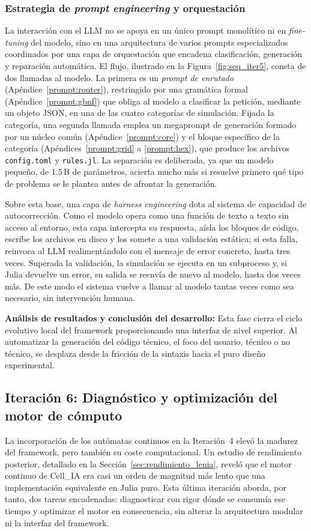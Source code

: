 \documentclass[runningheads]{llncs}
\begin{document}
\subsubsection{Estrategia de \textit{prompt engineering} y orquestación}
\label{sec:prompt_eng}
La interacción con el LLM no se apoya en un único prompt monolítico ni en \textit{fine-tuning} del modelo, sino en una arquitectura de varios prompts especializados coordinados por una capa de orquestación que encadena clasificación, generación y reparación automática. El flujo, ilustrado en la Figura~\ref{fig:seq_iter5}, consta de dos llamadas al modelo. La primera es un \emph{prompt de enrutado} (Apéndice~\ref{prompt:router}), restringido por una gramática formal (Apéndice~\ref{prompt:gbnf}) que obliga al modelo a clasificar la petición, mediante un objeto JSON, en una de las cuatro categorías de simulación. Fijada la categoría, una segunda llamada emplea un megaprompt de generación formado por un núcleo común (Apéndice~\ref{prompt:core}) y el bloque específico de la categoría (Apéndices~\ref{prompt:grid} a \ref{prompt:hex}), que produce los archivos \texttt{config.toml} y \texttt{rules.jl}. La separación es deliberada, ya que un modelo pequeño, de 1.5\,B de parámetros, acierta mucho más si resuelve primero qué tipo de problema se le plantea antes de afrontar la generación.

Sobre esta base, una capa de \textit{harness engineering} dota al sistema de capacidad de autocorrección. Como el modelo opera como una función de texto a texto sin acceso al entorno, esta capa intercepta su respuesta, aísla los bloques de código, escribe los archivos en disco y los somete a una validación estática; si esta falla, reinvoca al LLM realimentándolo con el mensaje de error concreto, hasta tres veces. Superada la validación, la simulación se ejecuta en un subproceso y, si Julia devuelve un error, su salida se reenvía de nuevo al modelo, hasta dos veces más. De este modo el sistema vuelve a llamar al modelo tantas veces como sea necesario, sin intervención humana.

\textbf{Análisis de resultados y conclusión del desarrollo:} Esta fase cierra el ciclo evolutivo local del framework proporcionando una interfaz de nivel superior. Al automatizar la generación del código técnico, el foco del usuario, técnico o no técnico, se desplaza desde la fricción de la sintaxis hacia el puro diseño experimental. 

\subsection{Iteración 6: Diagnóstico y optimización del motor de cómputo}
\label{sec:iteracion6}
La incorporación de los autómatas continuos en la Iteración~4 elevó la madurez del framework, pero también su coste computacional. Un estudio de rendimiento posterior, detallado en la Sección~\ref{sec:rendimiento_lenia}, reveló que el motor continuo de Cell\_IA era casi un orden de magnitud más lento que una implementación equivalente en Julia puro. Esta última iteración aborda, por tanto, dos tareas encadenadas: diagnosticar con rigor dónde se consumía ese tiempo y optimizar el motor en consecuencia, sin alterar la arquitectura modular ni la interfaz del framework.
\end{document}
